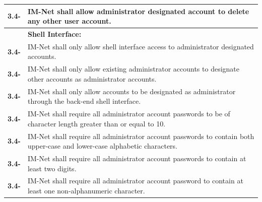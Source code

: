 \documentclass[letterpaper,12pt]{article}
\newcounter{rcounter}						%
\newcommand\rnumber{\stepcounter{rcounter}\arabic{rcounter}}
\begin{document}
{\begin{center}
\begin{tabular}{|l|p{6in}|}
\textbf{3.4-\rnumber} & IM-Net shall allow administrator designated account to delete any other user account. \\ 
\hline
& \textbf{Shell Interface:} \\
\hline
\textbf{3.4-\rnumber} & IM-Net shall only allow shell interface access to administrator designated accounts. \\ 
\hline 
\textbf{3.4-\rnumber} & IM-Net shall only allow existing administrator accounts to designate other accounts as administrator accounts. \\
\hline 
\textbf{3.4-\rnumber} & IM-Net shall only allow accounts to be designated as administrator through the back-end shell interface. \\ 
\hline 
\textbf{3.4-\rnumber} & IM-Net shall require all administrator account passwords to be of character length greater than or equal to 10.  \\ 
\hline 
\textbf{3.4-\rnumber} & IM-Net shall require all administrator account passwords to contain both upper-case and lower-case alphabetic characters. \\
\hline 
\textbf{3.4-\rnumber} & IM-Net shall require all administrator account passwords to contain at least two digits. \\ 
\hline 
\textbf{3.4-\rnumber} & IM-Net shall require all administrator account password to contain at least one non-alphanumeric character. \\ 
\hline 


\end{tabular} 
\end{center}

}
\end{document}
